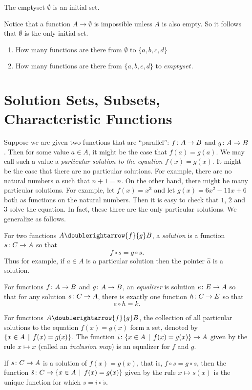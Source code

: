 \begin{principle}
	The emptyset $\emptyset$ is an initial set.
\end{principle}

Notice that a function $A\to\emptyset$ is impossible unless $A$ is also empty.
So it follows that $\emptyset$ is the only initial set. 

\begin{exercises}
	\begin{enumerate}
		\item How many functions are there from $\emptyset$ to $\{a,b,c,d\}$
		\item How many functions are there from $\{a,b,c,d\}$ to $emptyset$.
	\end{enumerate}
\end{exercises}


\section{Solution Sets, Subsets, Characteristic Functions}

Suppose we are given two functions that are ``parallel'': ${f}\colon{A}\to{B}$ and ${g}\colon{A}\to{B}$.
Then for some value $a\in A$, it might be the case that $f(a)=g(a)$.
We may call such a value a \emph{particular solution to the equation $f(x)=g(x)$}. 
It might be the case that there are no particular solutions.
For example, there are no natural numbers $n$ such that $n+1 = n$. 
On the other hand, there might be many particular solutions. 
For example, let $f(x)=x^3$ and let $g(x)= 6x^2 - 11x + 6$ both as functions on the natural numbers.
Then it is easy to check that $1$, $2$ and $3$ solve the equation.
In fact, these three are the only particular solutions.
We generalize as follows.

\begin{defn}\label{def:equalizer} 
	For two functions $A\doublerightarrow{f}{g} B$, a \emph{solution} is a function ${s}\colon{C}\to{A}$ so that 
	\[f\circ s = g\circ s.\]
	Thus for example, if $a\in A$ is a particular solution then the pointer $\hat a$ is a solution. 

	For functions ${f}\colon{A}\to{B}$ and ${g}\colon{A}\to{B}$, an \emph{equalizer} is solution ${e}\colon{E}\to{A}$ so that for any solution ${s}\colon{C}\to{A}$, there is exactly one function ${h}\colon{C}\to{E}$ so that \[e\circ h = k.\]
\end{defn}

\begin{principle}
	For functions $A\doublerightarrow{f}{g} B$, the collection of all particular solutions to the equation $f(x)=g(x)$ form a set, denoted by $\{x\in A\,\mid\, f(x) = g(x)\}$. 	
	The function ${i}\colon{\{x\in A\,\mid\,f(x)=g(x)\}}\to{A}$ given by the rule $x\mapsto x$ (called an \emph{inclusion map}) is an equalizer for $f$ and $g$.
	
	If ${s}\colon{C}\to{A}$ is a solution of  $f(x)=g(x)$, that is, $f\circ s = g\circ s$,
	then the function ${\check s}\colon{C}\to{\{x\in A\,\mid\,f(x)=g(x)\}}$ given by the rule $x\mapsto s(x)$
	is the unique function for which $s = i\circ \check s$. 
\end{principle}

